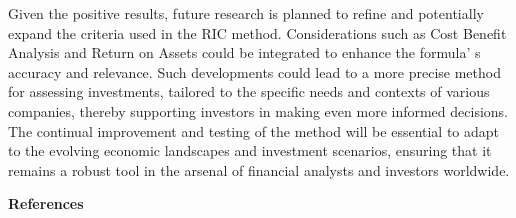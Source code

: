 \begin{multicols}{2}
Given the positive results, future research is planned to refine and
potentially expand the criteria used in the RIC method. Considerations
such as Cost Benefit Analysis and Return on Assets could be integrated
to enhance the formula' s accuracy and relevance. Such
developments could lead to a more precise method for assessing
investments, tailored to the specific needs and contexts of various
companies, thereby supporting investors in making even more informed
decisions. The continual improvement and testing of the method will be
essential to adapt to the evolving economic landscapes and investment
scenarios, ensuring that it remains a robust tool in the arsenal of
financial analysts and investors worldwide.
\end{multicols}

\begin{center}
{\bfseries References}
\end{center}

